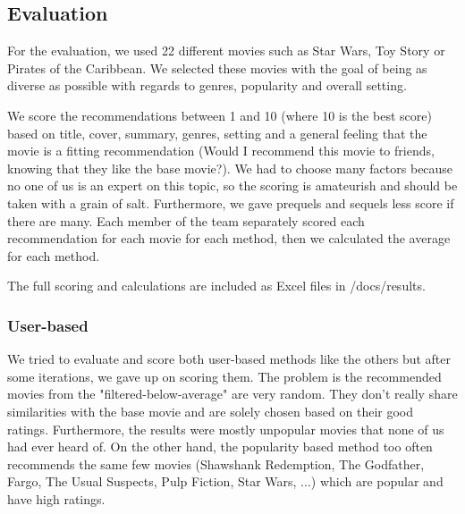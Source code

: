 \documentclass{article}
\begin{document}
\subsection{Evaluation}
For the evaluation, we used 22 different movies such as Star Wars, Toy Story or Pirates of the Caribbean.
We selected these movies with the goal of being as diverse as possible with regards to genres, popularity and overall setting.

We score the recommendations between 1 and 10 (where 10 is the best score) based on title, cover, summary, genres, setting and a general feeling that the movie is a fitting recommendation (Would I recommend this movie to friends, knowing that they like the base movie?). We had to choose many factors because no one of us is an expert on this topic, so the scoring is amateurish and should be taken with a grain of salt. Furthermore, we gave prequels and sequels less score if there are many.
Each member of the team separately scored each recommendation for each movie for each method, then we calculated the average for each method.

The full scoring and calculations are included as Excel files in /docs/results.
\subsubsection{User-based}
We tried to evaluate and score both user-based methods like the others but after some iterations, we gave up on scoring them. The problem is the recommended movies from the "filtered-below-average" are very random. They don't really share similarities with the base movie and are solely chosen based on their good ratings. Furthermore, the results were mostly unpopular movies that none of us had ever heard of. On the other hand, the popularity based method too often recommends the same few movies (Shawshank Redemption, The Godfather, Fargo, The Usual Suspects, Pulp Fiction, Star Wars, ...) which are popular and have high ratings.
\end{document}
